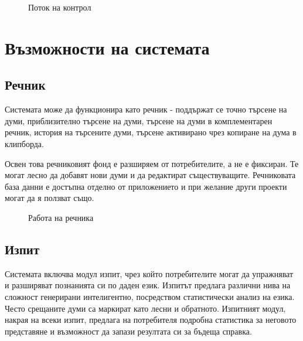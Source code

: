 \begin{figure}[htbp]
  \caption{Поток на контрол}
  \centering
\end{figure}
\section{Възможности на системата}
\subsection{Речник}
Системата може да функционира като речник - поддържат се точно търсене
на думи, приблизително търсене на думи, търсене на думи в
комплементарен речник, история на търсените думи, търсене активирано
чрез копиране на дума в клипборда. 

Освен това речниковият фонд е разширяем от потребителите, а не е
фиксиран. Те могат лесно да добавят нови думи и да редактират
съществуващите. Речниковата база данни е достъпна отделно от приложението
и при желание други проекти могат да я ползват също.
\begin{figure}[htbp]
  \caption{Работа на речника}
  \centering
\end{figure}

\subsection{Изпит}
Системата включва модул изпит, чрез който потребителите могат да
упражняват и разширяват познанията си по даден език. Изпитът предлага
различни нива на сложност генерирани интелигентно, посредством
статистически анализ на езика. Често срещаните думи са маркират като
лесни и обратното. Изпитният модул, накрая на всеки изпит, предлага на
потребителя подробна статистика за неговото представяне и възможност
да запази резултата си за бъдеща справка.

